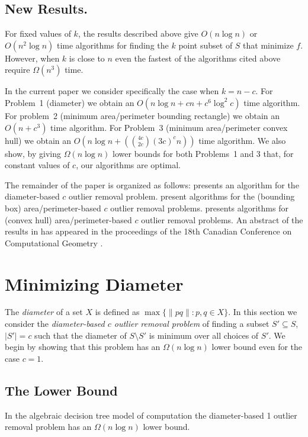 \documentclass[lotsofwhite]{patmorin}
\newcommand{\runtime}{n\log n + \left({4c\choose 2c}(3c)^cn\right)}
\newcommand{\Oruntime}{O\left(\runtime\right)}
\begin{document}
\subsection{New Results.}

For fixed values of $k$, the results described above give $O(n\log n)$
or $O(n^2\log n)$ time algorithms for finding the $k$ point subset of
$S$ that minimize $f$.  However, when $k$ is close to $n$ even the
fastest of the algorithms cited above require $\Omega(n^3)$ time.  

In the current paper we consider specifically the case when $k=n-c$.
For Problem~1 (diameter) we obtain an $O(n\log n + cn + c^6\log^2 c)$
time algorithm.  For problem~2 (minimum area/perimeter bounding
rectangle) we obtain an $O(n + c^3)$ time algorithm.  For Problem~3
(minimum area/perimeter convex hull) we obtain an $\Oruntime$ time
algorithm.  We also show, by giving $\Omega(n\log n)$ lower bounds for
both Problems~1 and 3 that, for constant values of $c$, our algorithms
are optimal.

The remainder of the paper is organized as follows: 
presents an algorithm for the diameter-based $c$ outlier removal
problem.   present algorithms for the (bounding box)
area/perimeter-based $c$ outlier removal problems.  
presents algorithms for (convex hull) area/perimeter-based $c$
outlier removal problems.  An abstract of the results in 
has appeared in the proceedings of the 18th Canadian Conference on
Computational Geometry \cite{amw06}.

\section{Minimizing Diameter}

The \emph{diameter} of a set $X$ is defined as $\max\{\|pq\|:p,q\in
X\}$.  In this section we consider the \emph{diameter-based $c$ outlier
removal problem} of finding a subset $S'\subseteq S$, $|S'|=c$ such
that the diameter of $S\setminus S'$ is minimum over all choices of
$S'$.  We begin by showing that this problem has an $\Omega(n\log n)$
lower bound even for the case $c=1$.

\subsection{The Lower Bound}

\begin{thm}
In the algebraic decision tree model of computation the diameter-based
1 outlier removal problem has 
an $\Omega(n\log n)$ lower bound.
\end{thm}
\end{document}
